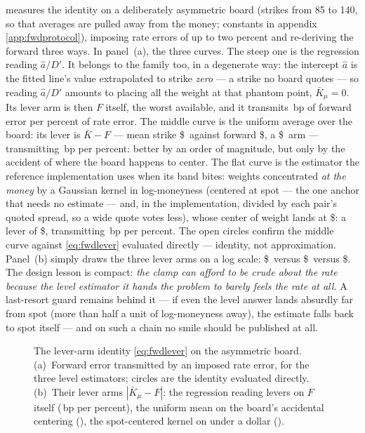  measures the identity on a deliberately
asymmetric board (strikes from 85 to 140, so that averages are
pulled away from the money; constants in appendix
\ref{app:fwdprotocol}), imposing rate errors of up to two percent and
re-deriving the forward three ways.  In panel~(a), the three curves.
The steep one is the regression reading $\hat a/D'$.  It belongs to
the family too, in a degenerate way: the intercept $\hat a$ is the
fitted line's value extrapolated to strike \emph{zero} --- a strike
no board quotes --- so reading $\hat a/D'$ amounts to placing all
the weight at that phantom point, $\bar K_\mu=0$.  Its lever arm is
then $F$ itself, the worst available, and it transmits
\MacFwdLeverNaiveBpPerPct\,bp of forward error per percent of rate
error.  The middle curve is the uniform average over the board: its lever is
$\bar K-F$ --- mean strike \$\MacFwdLeverKbarDollars\ against forward
\$\MacFwdLeverFwdDollars, a
\$\MacFwdLeverUnifLeverDollars\ arm --- transmitting
\MacFwdLeverUnifBpPerPct\,bp per percent: better by an order of
magnitude, but only by the accident of where the board happens to
center.  The flat curve is the estimator
the reference implementation uses when its band bites: weights
concentrated \emph{at the money} by a Gaussian kernel in
log-moneyness (centered at spot --- the one anchor that needs no
estimate --- and, in the implementation, divided by each pair's
quoted spread, so a wide quote votes less), whose center of weight lands at
\$\MacFwdLeverKbarKernDollars: a lever of
\$\MacFwdLeverKernLeverDollars, transmitting
\MacFwdLeverKernBpPerPct\,bp per percent.  The open circles confirm
the middle curve against \eqref{eq:fwdlever} evaluated directly ---
identity, not approximation.  Panel~(b) simply draws the three lever
arms on a log scale: \$\MacFwdLeverFwdDollars\ versus
\$\MacFwdLeverUnifLeverDollars\ versus
\$\MacFwdLeverKernLeverDollars.  The design lesson is compact: \emph{the clamp can
afford to be crude about the rate because the level estimator it
hands the problem to barely feels the rate at all.}  A last-resort
guard remains behind it --- if even the level answer lands absurdly
far from spot (more than half a unit of log-moneyness away), the
estimate falls back to spot itself ---
and on such a chain no smile should be published at all.

\begin{figure}[htbp]
\centering
{}
\caption{The lever-arm identity \eqref{eq:fwdlever} on the asymmetric
board.  (a)~Forward error transmitted by an imposed rate error, for
the three level estimators; circles are the identity evaluated
directly.  (b)~Their lever arms $|\bar K_\mu-F|$: the regression
reading levers on $F$ itself
(\MacFwdLeverNaiveBpPerPct\,bp per percent), the uniform mean on the
board's accidental centering (\MacFwdLeverUnifBpPerPct), the
spot-centered kernel on under a dollar
(\MacFwdLeverKernBpPerPct).}
\label{fig:fwdlever}
\end{figure}

